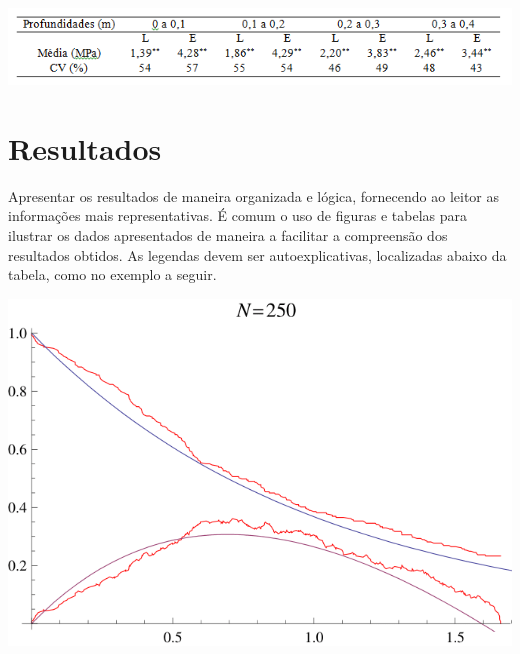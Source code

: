 \documentclass[a0,portrait]{a0poster}
\begin{document}
\begin{multicols}{2}
\vspace{2cm}
\begin{minipage}[b]{1.0\linewidth}
\begin{center}
\includegraphics[width=37cm]{tabela.png}
\end{center}
\end{minipage}
\vspace{-1cm}



\section*{Resultados}
\vspace{-1cm}
Apresentar os resultados de maneira organizada e l\'ogica, fornecendo ao leitor as informa\c c\~oes mais representativas. \'E comum o uso de figuras e tabelas para ilustrar os dados apresentados de maneira a facilitar a compreens\~ao dos resultados obtidos. As legendas devem ser autoexplicativas, localizadas abaixo da tabela, como no exemplo a seguir.

\vspace{2cm}
\begin{minipage}[b]{1.0\linewidth}
\begin{center}
\includegraphics[scale=0.8]{figura.png}
\end{center}
\end{minipage}
\vspace{-1cm}



\end{multicols}
\end{document}

